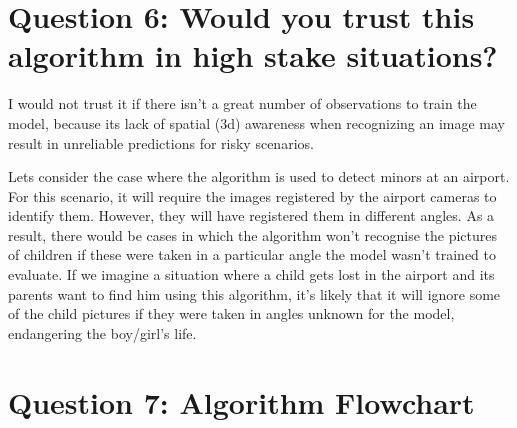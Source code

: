 \documentclass[11pt]{article}
\begin{document}
    \hypertarget{question-6-would-you-trust-this-algorithm-in-high-stake-situations}{%
\section*{Question 6: Would you trust this algorithm in high stake
situations?}\label{question-6-would-you-trust-this-algorithm-in-high-stake-situations}}

    I would not trust it if there isn't a great number of observations to
train the model, because its lack of spatial (3d) awareness when
recognizing an image may result in unreliable predictions for risky
scenarios.

Lets consider the case where the algorithm is used to detect minors at
an airport. For this scenario, it will require the images registered by
the airport cameras to identify them. However, they will have registered
them in different angles. As a result, there would be cases in which the
algorithm won't recognise the pictures of children if these were taken
in a particular angle the model wasn't trained to evaluate. If we
imagine a situation where a child gets lost in the airport and its
parents want to find him using this algorithm, it's likely that it will
ignore some of the child pictures if they were taken in angles unknown
for the model, endangering the boy/girl's life.


\section*{Question 7: Algorithm
Flowchart}
    \hypertarget{question-7-algorithm-flowchart}{%
\label{question-7-algorithm-flowchart}}
\end{document}
